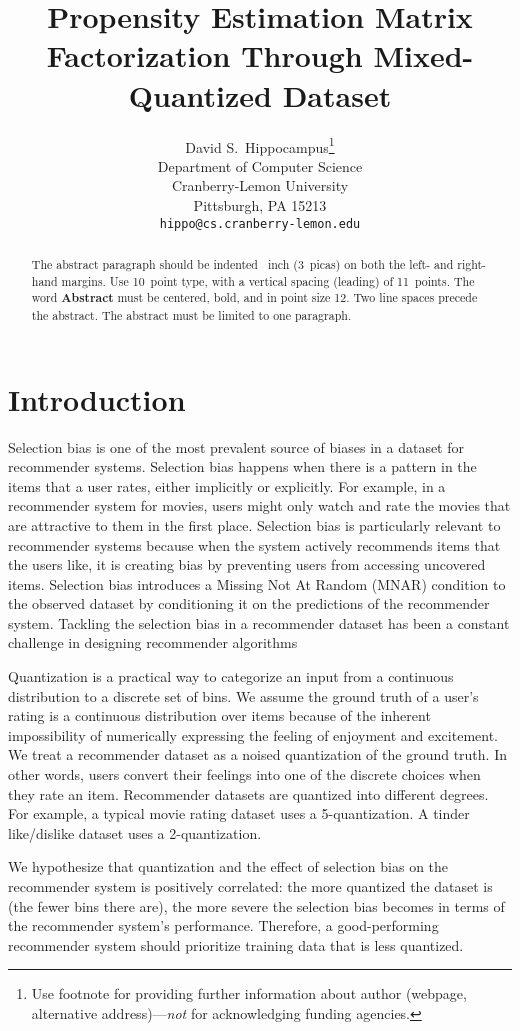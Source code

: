 \documentclass{article}
\title{Propensity Estimation Matrix Factorization Through Mixed-Quantized Dataset}
\author{%
  David S.~Hippocampus\thanks{Use footnote for providing further information
    about author (webpage, alternative address)---\emph{not} for acknowledging
    funding agencies.} \\
  Department of Computer Science\\
  Cranberry-Lemon University\\
  Pittsburgh, PA 15213 \\
  \texttt{hippo@cs.cranberry-lemon.edu} \\
}
\begin{document}
\maketitle


\begin{abstract}
  The abstract paragraph should be indented ~inch (3~picas) on
  both the left- and right-hand margins. Use 10~point type, with a vertical
  spacing (leading) of 11~points.  The word \textbf{Abstract} must be centered,
  bold, and in point size 12. Two line spaces precede the abstract. The abstract
  must be limited to one paragraph.
\end{abstract}

\section{Introduction}
Selection bias is one of the most prevalent source of biases in a dataset for recommender systems. Selection bias happens when there is a pattern in the items that a user rates, either implicitly or explicitly. For example, in a recommender system for movies, users might only watch and rate the movies that are attractive to them in the first place. Selection bias is particularly relevant to recommender systems because when the system actively recommends items that the users like, it is creating bias by preventing users from accessing uncovered items. Selection bias introduces a Missing Not At Random (MNAR) condition to the observed dataset by conditioning it on the predictions of the recommender system. Tackling the selection bias in a recommender dataset has been a constant challenge in designing recommender algorithms

Quantization is a practical way to categorize an input from a continuous distribution to a discrete set of bins. We assume the ground truth of a user's rating is a continuous distribution over items because of the inherent impossibility of numerically expressing the feeling of enjoyment and excitement. We treat a recommender dataset as a noised quantization of the ground truth. In other words, users convert their feelings into one of the discrete choices when they rate an item. Recommender datasets are quantized into different degrees. For example, a typical movie rating dataset uses a 5-quantization. A tinder like/dislike dataset uses a 2-quantization.

We hypothesize that quantization and the effect of selection bias on the recommender system is positively correlated: the more quantized the dataset is (the fewer bins there are), the more severe the selection bias becomes in terms of the recommender system's performance. Therefore, a good-performing recommender system should prioritize training data that is less quantized. 
\end{document}
